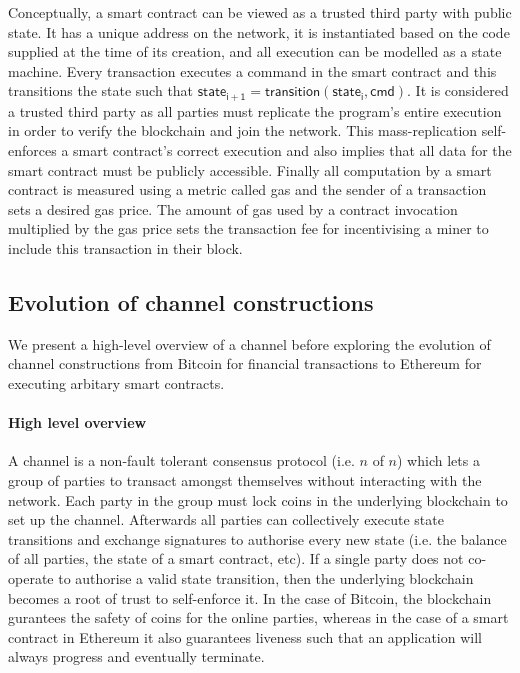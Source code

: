 \documentclass{llncs}
\newcommand{\stateinfoi}{\mathsf{state}_{\mathsf{i}}}
\newcommand{\stateinfoplus}{\mathsf{state}_{\mathsf{i+1}}}
\begin{document}
Conceptually, a smart contract can be viewed as a trusted third party with public state. 
It has a unique address on the network, it is instantiated based on the code supplied at the time of its creation, and all execution can be modelled as a state machine. 
Every transaction executes a command in the smart contract and this transitions the state such that $\stateinfoplus = \mathsf{transition}(\stateinfoi, \mathsf{cmd})$. 
It is considered a trusted third party as all parties must replicate the program's entire execution in order to verify the blockchain and join the network.  
This mass-replication self-enforces a smart contract's correct execution and also implies that all data for the smart contract must be publicly accessible. 
Finally all computation by a smart contract is measured using a metric called gas and the sender of a transaction sets a desired gas price. 
The amount of gas used by a contract invocation multiplied by the gas price sets the transaction fee for incentivising a miner to include this transaction in their block. 

\subsection{Evolution of channel constructions}

We present a high-level overview of a channel before exploring the evolution of channel constructions from  Bitcoin for financial transactions to Ethereum for executing arbitary smart contracts. 

\paragraph{High level overview}
A channel is a non-fault tolerant consensus protocol (i.e. $n$ of $n$) which lets a group of parties to transact amongst themselves without interacting with the network. 
Each party in the group must lock coins in the underlying blockchain to set up the channel. 
Afterwards all parties can collectively execute state transitions and exchange signatures to authorise every new state (i.e. the balance of all parties, the state of a smart contract, etc). 
If a single party does not co-operate to authorise a valid state transition, then the underlying blockchain becomes a root of trust to self-enforce it. 
In the case of Bitcoin, the blockchain gurantees the safety of coins for the online parties, whereas in the case of a smart contract in Ethereum it also guarantees liveness such that an application will always progress and eventually terminate. 
\end{document}

